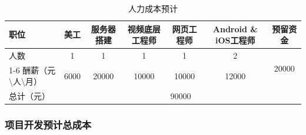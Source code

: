 \begin{table}[H]
  \centering
  \caption{人力成本预计}
    \begin{tabular}{|p{4.055em}|cccccc|}
    \hline
    \textcolor[rgb]{ .298,  .282,  .239}{职位} & \multicolumn{1}{p{4.055em}|}{\textcolor[rgb]{ .298,  .282,  .239}{美工}} & \multicolumn{1}{p{5em}|}{\textcolor[rgb]{ .298,  .282,  .239}{服务器搭建}} & \multicolumn{1}{p{4.055em}|}{\textcolor[rgb]{ .298,  .282,  .239}{视频底层工程师}} & \multicolumn{1}{p{4.165em}|}{\textcolor[rgb]{ .298,  .282,  .239}{网页工程师}} & \multicolumn{1}{p{5.665em}|}{\textcolor[rgb]{ .298,  .282,  .239}{Android \& iOS工程师}} & \multicolumn{1}{p{4.055em}|}{\textcolor[rgb]{ .298,  .282,  .239}{预留资金}} \\
    \hline
    \textcolor[rgb]{ .298,  .282,  .239}{人数} & \multicolumn{1}{c|}{\textcolor[rgb]{ .298,  .282,  .239}{1}} & \multicolumn{1}{c|}{\textcolor[rgb]{ .298,  .282,  .239}{1}} & \multicolumn{1}{c|}{\textcolor[rgb]{ .298,  .282,  .239}{1}} & \multicolumn{1}{c|}{\textcolor[rgb]{ .298,  .282,  .239}{1}} & \multicolumn{1}{c|}{\textcolor[rgb]{ .298,  .282,  .239}{2}} & \multirow{2}[4]{*}{\textcolor[rgb]{ .298,  .282,  .239}{20000}} \\
\hline{1-6}    \textcolor[rgb]{ .298,  .282,  .239}{酬薪（元\textbackslash{}人\textbackslash{}月）} & \multicolumn{1}{c|}{\textcolor[rgb]{ .298,  .282,  .239}{6000}} & \multicolumn{1}{c|}{\textcolor[rgb]{ .298,  .282,  .239}{20000}} & \multicolumn{1}{c|}{\textcolor[rgb]{ .298,  .282,  .239}{10000}} & \multicolumn{1}{c|}{\textcolor[rgb]{ .298,  .282,  .239}{10000}} & \multicolumn{1}{c|}{\textcolor[rgb]{ .298,  .282,  .239}{12000}} &  \\
    \hline
    \textcolor[rgb]{ .298,  .282,  .239}{总计（元）} & \multicolumn{6}{c|}{\textcolor[rgb]{ .298,  .282,  .239}{90000}} \\
    \hline
    \end{tabular}%
  \label{tab:rlcb}%
\end{table}%


\subsubsection{项目开发预计总成本}\

